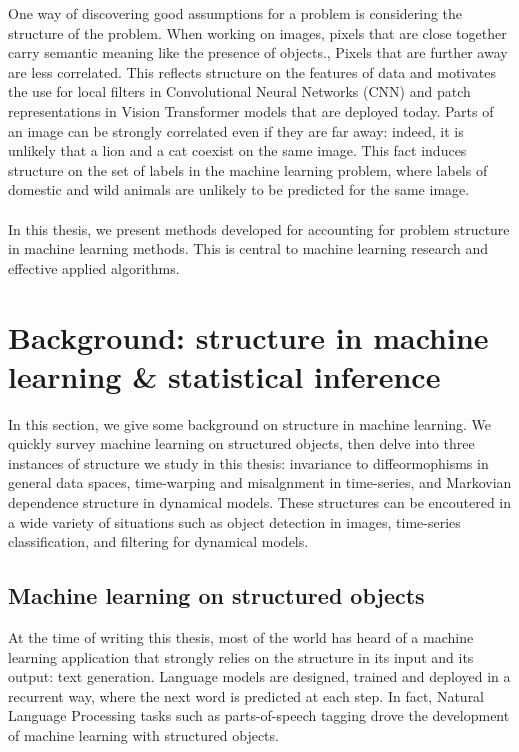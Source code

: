 One way of discovering good assumptions for a problem is considering the structure of the problem. When working on images, pixels that are close together carry semantic meaning like the presence of objects., Pixels that are further away are less correlated. This reflects structure on the features of data and motivates the use for local filters in Convolutional Neural Networks (CNN) and patch representations in Vision Transformer models that are deployed today. Parts of an image can be strongly correlated even if they are far away: indeed, it is unlikely that a lion and a cat coexist on the same image. This fact induces structure on the set of labels in the machine learning problem, where labels of domestic and wild animals are unlikely to be predicted for the same image.

\paragraph{}
In this thesis, we present methods developed for accounting for problem structure in machine learning methods. This is central to machine learning research and effective applied algorithms.

\section{Background: structure in machine learning \& statistical inference}

In this section, we give some background on structure in machine learning. We quickly survey machine learning on structured objects, then delve into three instances of structure we study in this thesis: invariance to diffeormophisms in general data spaces, time-warping and misalgnment in time-series, and Markovian dependence structure in dynamical models. These structures can be encoutered in a wide variety of situations such as object detection in images, time-series classification, and filtering for dynamical models.

\subsection{Machine learning on structured objects}

At the time of writing this thesis, most of the world has heard of a machine learning application that strongly relies on the structure in its input and its output: text generation. Language models are designed, trained and deployed in a recurrent way, where the next word is predicted at each step. In fact, Natural Language Processing tasks such as parts-of-speech tagging drove the development of machine learning with structured objects.


